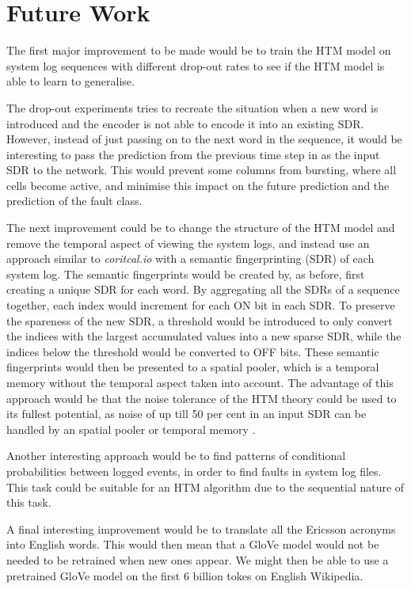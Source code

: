 \section{Future Work}
The first major improvement to be made would be to train the HTM model on system log sequences with different drop-out rates to see if the HTM model is able to learn to generalise. 


The drop-out experiments tries to recreate the situation when a new word is introduced and the encoder is not able to encode it into an existing SDR. However, instead of just passing on to the next word in the sequence, it would be interesting to pass the prediction from the previous time step in as the input SDR to the network. This would prevent some columns from bursting, where all cells become active, and minimise this impact on the future prediction and the prediction of the fault class.


The next improvement could be to change the structure of the HTM model and remove the temporal aspect of viewing the system logs, and instead use an approach similar to \textit{coritcal.io} \cite{DBLP:journals/corr/Webber15} with a semantic fingerprinting (SDR) of each system log. The semantic fingerprints would be created by, as before, first creating a unique SDR for each word. By aggregating all the SDRs of a sequence together, each index would increment for each ON bit in each SDR. To preserve the spareness of the new SDR, a threshold would be introduced to only convert the indices with the largest accumulated values into a new sparse SDR, while the indices below the threshold would be converted to OFF bits. These semantic fingerprints would then be presented to a spatial pooler, which is a temporal memory without the temporal aspect taken into account. The advantage of this approach would be that the noise tolerance of the HTM theory could be used to its fullest potential, as noise of up till 50 per cent in an input SDR can be handled by an spatial pooler or temporal memory \cite{10.3389/fncir.2016.00023}. 


Another interesting approach would be to find patterns of conditional probabilities between logged events, in order to find faults in system log files. This task could be suitable for an HTM algorithm due to the sequential nature of this task.


A final interesting improvement would be to translate all the Ericsson acronyms into English words. This would then mean that a GloVe model would not be needed to be retrained when new ones appear. We might then be able to use a pretrained GloVe model on the first 6 billion tokes on English Wikipedia.  




